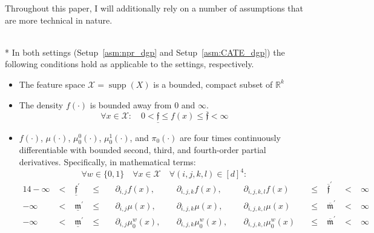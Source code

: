 Throughout this paper, I will additionally rely on a number of assumptions that are more technical in nature.
\begin{boxD}
	\begin{asm}\label{asm:technical}\mbox{}\\*
		In both settings (Setup~\ref{asm:npr_dgp} and Setup~\ref{asm:CATE_dgp}) the following conditions hold as applicable to the settings, respectively.
		\begin{itemize}
			\item The feature space $\mathcal{X} = \operatorname{supp}(X)$ is a bounded, compact subset of $\mathbb{R}^k$
			\item The density $f(\cdot)$ is bounded away from 0 and $\infty$.
            \begin{equation}
                \forall x \in \mathcal{X}: \quad 0 < \underline{\mathfrak{f}} \leq f(x) \leq \overline{\mathfrak{f}} < \infty
            \end{equation}
			\item $f(\cdot)$, $\mu(\cdot)$, $\mu_{0}^{0}(\cdot)$, $\mu_{0}^{1}(\cdot)$, and $\pi_{0}(\cdot)$ are four times continuously differentiable with bounded second, third, and fourth-order partial derivatives. Specifically, in mathematical terms: 
            \begin{equation}
            \forall w\in \{0,1\} \quad \forall x \in \mathcal{X} \quad \forall (i,j,k,l) \in [d]^{4}:
            \end{equation}
            \vspace{-0.8cm}
            \begin{alignat*}{14}
                -\infty & \; < \; & \underline{\mathfrak{f}}^{\prime} 
                & \; \leq \; && \partial_{i,j} f(x), \; && \partial_{i,j,k} f(x), \; && \partial_{i,j,k,l} f(x) && \; \leq \; & \overline{\mathfrak{f}}^{\prime} & \; < \; & \infty \\
                -\infty & \; < \; & \underline{\mathfrak{m}}^{\prime} 
                & \; \leq \; && \partial_{i,j} \mu(x), \; && \partial_{i,j,k} \mu(x), \; && \partial_{i,j,k,l} \mu(x)
                && \; \leq \; & \overline{\mathfrak{m}}^{\prime} & \; < \; & \infty \\
                -\infty & \; < \; & \underline{\mathfrak{m}}^{\prime} 
                & \; \leq \; && \partial_{i,j} \mu_{0}^{w}(x), \; && \partial_{i,j,k} \mu_{0}^{w}(x), \; && \partial_{i,j,k,l} \mu_{0}^{w}(x)
                && \; \leq \; & \overline{\mathfrak{m}}^{\prime} & \; < \; & \infty \\

\end{alignat*}
\end{itemize}
\end{asm}
\end{boxD}
